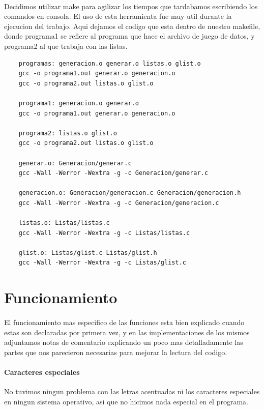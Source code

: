 \documentclass{article}
\begin{document}
	\paragraph{}
	Decidimos utilizar make para agilizar los tiempos que tardabamos escribiendo los comandos en consola. El uso de esta herramienta fue muy util durante la ejecucion del trabajo. Aqui dejamos el codigo que esta dentro de nuestro makefile, donde programa1 se refiere al programa que hace el archivo de juego de datos, y programa2 al que trabaja con las listas.
	\begin{verbatim}
	programas: generacion.o generar.o listas.o glist.o
	gcc -o programa1.out generar.o generacion.o
	gcc -o programa2.out listas.o glist.o
	
	programa1: generacion.o generar.o
	gcc -o programa1.out generar.o generacion.o
	
	programa2: listas.o glist.o 
	gcc -o programa2.out listas.o glist.o
	
	generar.o: Generacion/generar.c
	gcc -Wall -Werror -Wextra -g -c Generacion/generar.c
	
	generacion.o: Generacion/generacion.c Generacion/generacion.h
	gcc -Wall -Werror -Wextra -g -c Generacion/generacion.c
	
	listas.o: Listas/listas.c
	gcc -Wall -Werror -Wextra -g -c Listas/listas.c
	
	glist.o: Listas/glist.c Listas/glist.h
	gcc -Wall -Werror -Wextra -g -c Listas/glist.c
	\end{verbatim}
	 \pagebreak
	 
	 \section{Funcionamiento}
	 \paragraph{}
	 El funcionamiento mas especifico de las funciones esta bien explicado cuando estas son declaradas por primera vez, y en las implementaciones de los mismos adjuntamos notas de comentario explicando un poco mas detalladamente las partes que nos parecieron necesarias para mejorar la lectura del codigo.
	 \paragraph{Caracteres especiales}
	 No tuvimos ningun problema con las letras acentuadas ni los caracteres especiales en ningun sistema operativo, asi que no hicimos nada especial en el programa.
\end{document}

